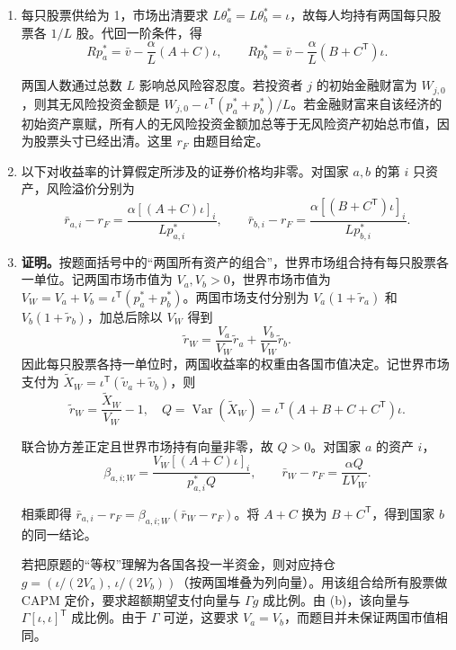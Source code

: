 \begin{solution}[blank-type=manual,blank-vsep=9\baselineskip]
\begin{enumerate}[label=(\alph*)]
\item 每只股票供给为 1，市场出清要求 $L\theta_a^*=L\theta_b^*=\iota$，故每人均持有两国每只股票各 $1/L$ 股。代回一阶条件，得
\[
 \boxed{Rp_a^*=\bar v-\frac\alpha L(A+C)\iota,\qquad
 Rp_b^*=\bar v-\frac\alpha L(B+C^{\mathsf T})\iota}.
\]

两国人数通过总数 $L$ 影响总风险容忍度。若投资者 $j$ 的初始金融财富为 $W_{j,0}$，则其无风险投资金额是 $W_{j,0}-\iota^{\mathsf T}(p_a^*+p_b^*)/L$。若金融财富来自该经济的初始资产禀赋，所有人的无风险投资金额加总等于无风险资产初始总市值，因为股票头寸已经出清。这里 $r_F$ 由题目给定。

\item 以下对收益率的计算假定所涉及的证券价格均非零。对国家 $a,b$ 的第 $i$ 只资产，风险溢价分别为
\[
 \bar r_{a,i}-r_F=\frac{\alpha[(A+C)\iota]_i}{Lp_{a,i}^*},\qquad
 \bar r_{b,i}-r_F=\frac{\alpha[(B+C^{\mathsf T})\iota]_i}{Lp_{b,i}^*}.
\]

\item \textbf{证明。}按题面括号中的“两国所有资产的组合”，世界市场组合持有每只股票各一单位。记两国市场市值为 $V_a,V_b>0$，世界市场市值为 $V_W=V_a+V_b=\iota^{\mathsf T}(p_a^*+p_b^*)$。两国市场支付分别为 $V_a(1+\widetilde r_a)$ 和 $V_b(1+\widetilde r_b)$，加总后除以 $V_W$ 得到
\[
 \widetilde r_W=\frac{V_a}{V_W}\widetilde r_a+\frac{V_b}{V_W}\widetilde r_b.
\]
因此每只股票各持一单位时，两国收益率的权重由各国市值决定。记世界市场支付为 $\widetilde X_W=\iota^{\mathsf T}(\widetilde v_a+\widetilde v_b)$，则
\[
 \widetilde r_W=\frac{\widetilde X_W}{V_W}-1,
 \quad Q=\operatorname{Var}(\widetilde X_W)
 =\iota^{\mathsf T}(A+B+C+C^{\mathsf T})\iota.
\]

联合协方差正定且世界市场持有向量非零，故 $Q>0$。对国家 $a$ 的资产 $i$，
\[
 \beta_{a,i;W}=\frac{V_W[(A+C)\iota]_i}{p_{a,i}^*Q},\qquad
 \bar r_W-r_F=\frac{\alpha Q}{LV_W}.
\]

相乘即得 $\bar r_{a,i}-r_F=\beta_{a,i;W}(\bar r_W-r_F)$。将 $A+C$ 换为 $B+C^{\mathsf T}$，得到国家 $b$ 的同一结论。

若把原题的“等权”理解为各国各投一半资金，则对应持仓 $g=(\iota/(2V_a),\,\iota/(2V_b))$（按两国堆叠为列向量）。用该组合给所有股票做 CAPM 定价，要求超额期望支付向量与 $\Gamma g$ 成比例。由 (b)，该向量与 $\Gamma[\iota,\iota]^{\mathsf T}$ 成比例。由于 $\Gamma$ 可逆，这要求 $V_a=V_b$，而题目并未保证两国市值相同。\qedhere
\end{enumerate}
\end{solution}

